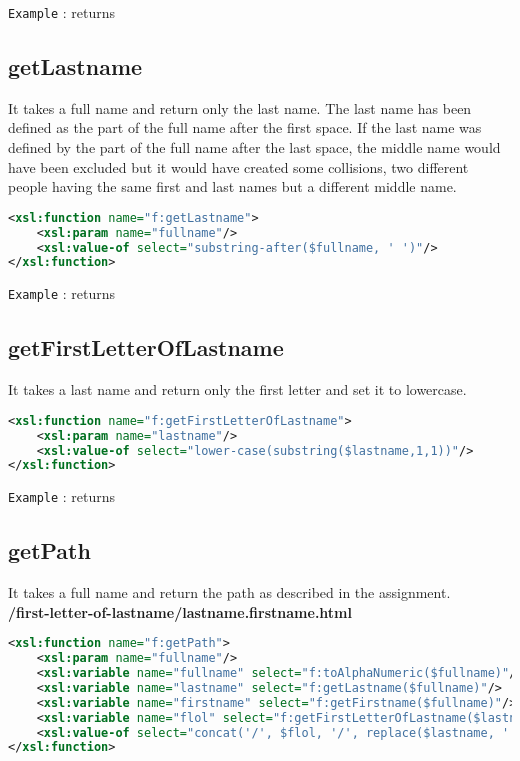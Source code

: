 \documentclass{article}[a4]
\begin{document}
\texttt{Example} :  returns 


\subsection{getLastname}

It takes a full name and return only the last name. The last name has been defined as the part of the full name after the first space. If the last name was defined by the part of the full name after the last space, the middle name would have been excluded but it would have created some collisions, two different people having the same first and last names but a different middle name.

\begin{lstlisting}[language=XML]
<xsl:function name="f:getLastname">
	<xsl:param name="fullname"/>
	<xsl:value-of select="substring-after($fullname, ' ')"/>
</xsl:function>
\end{lstlisting}

\texttt{Example} :  returns 

\subsection{getFirstLetterOfLastname}

It takes a last name and return only the first letter and set it to lowercase.

\begin{lstlisting}[language=XML]
<xsl:function name="f:getFirstLetterOfLastname">
	<xsl:param name="lastname"/>
	<xsl:value-of select="lower-case(substring($lastname,1,1))"/>
</xsl:function>
\end{lstlisting}

\texttt{Example} :  returns 

\subsection{getPath}
It takes a full name and return the path as described in the assignment.\\ \textbf{/first-letter-of-lastname/lastname.firstname.html}

\begin{lstlisting}[language=XML]
<xsl:function name="f:getPath">
	<xsl:param name="fullname"/>
	<xsl:variable name="fullname" select="f:toAlphaNumeric($fullname)"/>
	<xsl:variable name="lastname" select="f:getLastname($fullname)"/>
	<xsl:variable name="firstname" select="f:getFirstname($fullname)"/>
	<xsl:variable name="flol" select="f:getFirstLetterOfLastname($lastname)"/>
	<xsl:value-of select="concat('/', $flol, '/', replace($lastname, ' ', '_'), '.', replace($firstname, ' ', '_'), '.html')"/>
</xsl:function>
\end{lstlisting}
\end{document}

